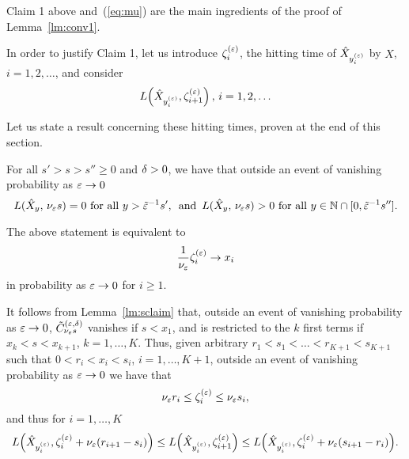 Claim 1 above and~(\ref{eq:mu}) are the main ingredients of the proof of Lemma~\ref{lm:conv1}.

In order to justify Claim 1, let us introduce $\zeta^{(\varepsilon)}_i$, the hitting time of $\hat X_{y^{(\varepsilon)}_i}$ 
by $X$, $i=1,2,\ldots$, and consider
\begin{equation}
\label{eq:l1}
L\!\left(\txt_{\yep_i},\ze_{i+1}\right),\,i=1,2,\ldots
\end{equation} 

Let us state a result concerning these hitting times, proven at the end of this section.
\begin{lm}
\label{lm:sclaim}
For all $s'>s>s''\geq0$ and $\delta>0$, we have that outside an event of vanishing probability as $\varepsilon\to0$
\begin{equation}
\label{eq:sc1}
L(\txt_{y},\,\nu_\eps s)=0 \mbox{ for all } y>\te^{-1}s',\,\mbox{ and }\,
L(\txt_{y},\,\nu_\eps s)>0 \mbox{ for all } y\in\N\cap[0,\te^{-1}s''].
\end{equation}
\end{lm}

\begin{rmk}
 \label{rmk:xitox}
The above statement is equivalent to
\begin{equation}
\label{eq:scalt}
\frac1{\nu_\eps} \ze_i\to x_i
\end{equation}
in probability as $\varepsilon\to0$ for $i\geq1$.
\end{rmk}

It follows from Lemma~\ref{lm:sclaim} that, %
outside an event of vanishing probability as $\varepsilon\to0$, 
$\tilde C^{(\varepsilon,\delta)}_{\nu_\varepsilon s}$ vanishes if $s<x_1$, and is restricted to the $k$ 
first terms if $x_k<s<x_{k+1}$, $k=1,\ldots,K$.
Thus, given arbitrary $r_1<s_1<\ldots<r_{K+1}<s_{K+1}$ such that $0<r_i<x_i<s_i$, $i=1,\ldots,K+1$, 
outside an event of vanishing probability as $\varepsilon\to0$ 
we have that 
\begin{equation}
\label{eq:l2}
\nu_\eps r_i\leq\ze_{i}\leq \nu_\eps s_i,
\end{equation}
and thus for $i=1,\ldots,K$
\begin{equation}\label{eq:l3}%
L\!\left(\txt_{\yep_i},\ze_{i}+\nu_\eps(r_{i+1}-s_i)\right)
\leq L\!\left(\txt_{\yep_i},\ze_{i+1}\right)%
\leq L\!\left(\txt_{\yep_i},\ze_{i}+\nu_\eps(s_{i+1}-r_i)\right)\!.
\end{equation}

